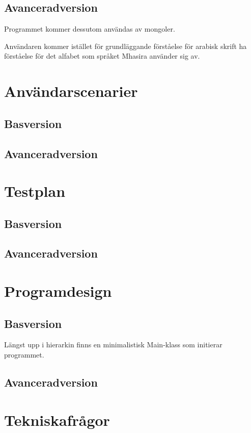 \documentclass[a4paper,11p,twoside]{report}
\begin{document}
\subsection{Avanceradversion}
Programmet kommer dessutom användas av mongoler.

Användaren kommer istället för grundläggande förståelse för arabisk skrift ha förståelse för det alfabet som språket Mhasira använder sig av.

\section{Användarscenarier}
\subsection{Basversion}


\subsection{Avanceradversion}


\section{Testplan}
\subsection{Basversion}

\subsection{Avanceradversion}

\section{Programdesign}
\subsection{Basversion}
Längst upp i hierarkin finns en minimalistisk Main-klass som initierar programmet.


\subsection{Avanceradversion}

\section{Tekniskafrågor}
\end{document}
